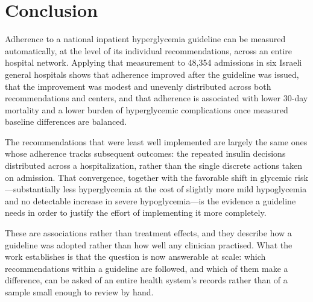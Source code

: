 \section{Conclusion}
\label{sec:conclusion}

Adherence to a national inpatient hyperglycemia guideline can be measured
automatically, at the level of its individual recommendations, across an
entire hospital network. Applying that measurement to 48,354 admissions in
six Israeli general hospitals shows that adherence improved after the
guideline was issued, that the improvement was modest and unevenly
distributed across both recommendations and centers, and that adherence is
associated with lower 30-day mortality and a lower burden of hyperglycemic
complications once measured baseline differences are balanced.

The recommendations that were least well implemented are largely the same
ones whose adherence tracks subsequent outcomes: the repeated insulin
decisions distributed across a hospitalization, rather than the
single discrete actions taken on admission. That convergence, together with
the favorable shift in glycemic risk---substantially less hyperglycemia at
the cost of slightly more mild hypoglycemia and no detectable increase in
severe hypoglycemia---is the evidence a guideline needs in order to justify
the effort of implementing it more completely.

These are associations rather than treatment effects, and they describe how
a guideline was adopted rather than how well any clinician practised. What
the work establishes is that the question is now answerable at scale: which
recommendations within a guideline are followed, and which of them make a
difference, can be asked of an entire health system's records rather than of
a sample small enough to review by hand.
